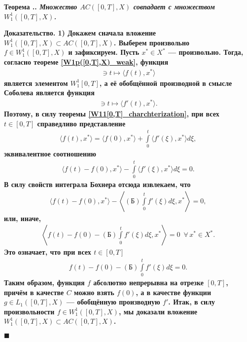 \documentclass{report}
\newcounter{rem}[section]
\newcounter{theor}[section]
\renewcommand{\thetheor}{\thesection.\arabic{theor}}
\newenvironment{Theorem}{\par\refstepcounter{theor}\bf Теорема \thetheor. \it}{\rm\par}
\newenvironment{Proof}{\par\noindent\bf Доказательство.\rm}{ $\blacksquare$\par}
\begin{document}
\begin{Theorem}\label{W11([0,T],X)_charachterization}
Множество $AC([0,T],X)$ совпадает с множеством $W^1_1([0,T],X)$.
\end{Theorem}
\begin{Proof}
1) Докажем сначала вложение $W^1_1([0,T],X)\subset AC([0,T],X)$. Выберем произвольно $f\in W^1_1([0,T],X)$ и зафиксируем. Пусть $x^*\in X^*$ --- произвольно. Тогда, согласно теореме
\ref{W1p([0,T],X)_weak}, функция
\begin{gather*}
[0,T]\ni t\mapsto\langle f(t),x^*\rangle
\end{gather*}
является элементом $W^1_1[0,T]$, а её обобщённой производной в смысле Соболева является функция
\begin{gather*}
[0,T]\ni t\mapsto\langle f'(t),x^*\rangle.
\end{gather*}
Поэтому, в силу теоремы \ref{W11[0,T]_charchterization}, при всех $t\in[0,T]$ справедливо представление
\begin{gather*}
\langle f(t),x^*\rangle=\langle f(0),x^*\rangle+\int\limits_0^t\langle f'(\xi),x^*\rangle d\xi,
\end{gather*}
эквивалентное соотношению
\begin{gather*}
\langle f(t)-f(0),x^*\rangle-\int\limits_0^t\langle f'(\xi),x^*\rangle d\xi=0.
\end{gather*}
В силу свойств интеграла Бохнера отсюда извлекаем, что
\begin{gather*}
\langle f(t)-f(0),x^*\rangle-\left\langle(\textrm{Б})\int\limits_0^t f'(\xi)d\xi,x^*\right\rangle =0,
\end{gather*}
или, иначе,
\begin{gather*}
\left\langle f(t)-f(0)-(\textrm{Б})\int\limits_0^t f'(\xi)d\xi,x^*\right\rangle =0\,\,\,\forall\,x^*\in X^*.
\end{gather*}
Это означает, что при всех $t\in[0,T]$
\begin{gather*}
 f(t)-f(0)-(\textrm{Б})\int\limits_0^t f'(\xi)d\xi=0.
\end{gather*}
Таким образом, функция $f$ абсолютно непрерывна на отрезке $[0,T]$, причём в качестве $C$ можно взять $f(0)$, а в качестве функции $g\in L_1([0,T],X)$ --- обобщённую производную $f'$. Итак,
в силу произвольности $f\in W^1_1([0,T],X)$, мы доказали вложение $W^1_1([0,T],X)\subset AC([0,T],X)$.


\end{Proof}
\end{document}
